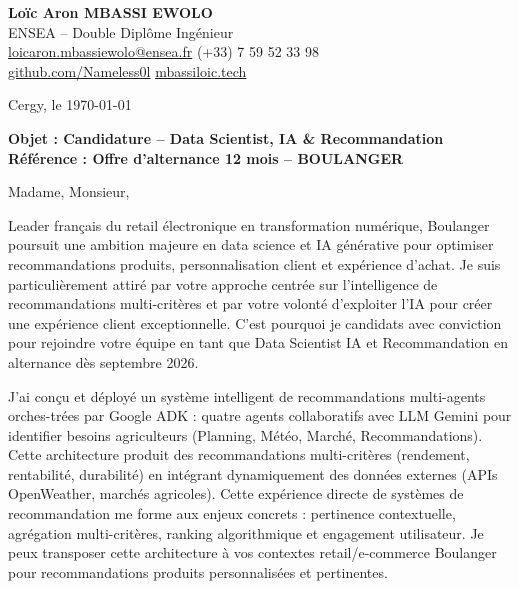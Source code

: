 \documentclass[a4paper,11pt]{article}
\begin{document}
\noindent
\textbf{Lo\"ic Aron MBASSI EWOLO} \\
ENSEA -- Double Dipl\^ome Ing\'enieur \\
\href{mailto:loicaron.mbassiewolo@ensea.fr}{loicaron.mbassiewolo@ensea.fr} \quad (+33) 7 59 52 33 98 \\
\href{https://github.com/Nameless0l}{github.com/Nameless0l} \quad \href{https://mbassiloic.tech}{mbassiloic.tech}

\vspace{1em}
\noindent
Cergy, le \today

\vspace{1em}
\noindent
\textbf{Objet : Candidature -- Data Scientist, IA \& Recommandation} \\
\textbf{R\'ef\'erence : Offre d'alternance 12 mois -- BOULANGER}

\vspace{1.5em}
\noindent Madame, Monsieur,

\vspace{0.8em}
\noindent Leader français du retail électronique en transformation numérique, Boulanger poursuit une ambition majeure en data science et IA générative pour optimiser recommandations produits, personnalisation client et expérience d'achat. Je suis particulièrement attiré par votre approche centrée sur l'intelligence de recommandations multi-critères et par votre volonté d'exploiter l'IA pour créer une expérience client exceptionnelle. C'est pourquoi je candidats avec conviction pour rejoindre votre équipe en tant que Data Scientist IA et Recommandation en alternance dès septembre 2026.

\vspace{0.8em}
\noindent J'ai conçu et déployé un système intelligent de recommandations multi-agents orches-trées par Google ADK : quatre agents collaboratifs avec LLM Gemini pour identifier besoins agriculteurs (Planning, Météo, Marché, Recommandations). Cette architecture produit des recommandations multi-critères (rendement, rentabilité, durabilité) en intégrant dynamiquement des données externes (APIs OpenWeather, marchés agricoles). Cette expérience directe de systèmes de recommandation me forme aux enjeux concrets : pertinence contextuelle, agrégation multi-critères, ranking algorithmique et engagement utilisateur. Je peux transposer cette architecture à vos contextes retail/e-commerce Boulanger pour recommandations produits personnalisées et pertinentes.
\end{document}
